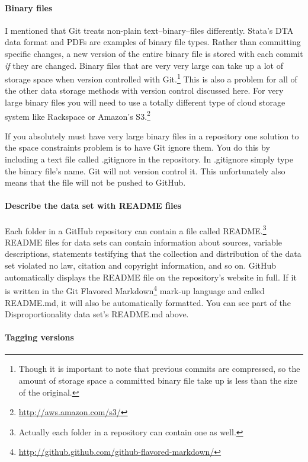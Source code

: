 \documentclass[twocolumn]{article}\usepackage{graphicx, color}
\begin{document}
\paragraph{Binary files}

I mentioned that Git treats non-plain text--binary--files differently. Stata's DTA data format and PDFs are examples of binary file types. Rather than committing specific changes, a new version of the entire binary file is stored with each commit \emph{if} they are changed. Binary files that are very very large can take up a lot of storage space when version controlled with Git.\footnote{Though it is important to note that previous commits are compressed, so the amount of storage space a committed binary file take up is less than the size of the original.} This is also a problem for all of the other data storage methods with version control discussed here. For very large binary files you will need to use a totally different type of cloud storage system like Rackspace or Amazon's S3.\footnote{\url{http://aws.amazon.com/s3/}} 

If you absolutely must have very large binary files in a repository one solution to the space constraints problem is to have Git ignore them. You do this by including a text file called .gitignore in the repository. In .gitignore simply type the binary file's name. Git will not version control it. This unfortunately also means that the file will not be pushed to GitHub.

\paragraph{Describe the data set with README files}

Each folder in a GitHub repository can contain a file called README.\footnote{Actually each folder in a repository can contain one as well.} README files for data sets can contain information about sources, variable descriptions, statements testifying that the collection and distribution of the data set violated no law, citation and copyright information, and so on. GitHub automatically displays the README file on the repository's website in full. If it is written in the Git Flavored Markdown\footnote{\url{http://github.github.com/github-flavored-markdown/}} mark-up language and called README.md, it will also be automatically formatted. You can see part of the Disproportionality data set's README.md above. 

\paragraph{Tagging versions}
\end{document}
